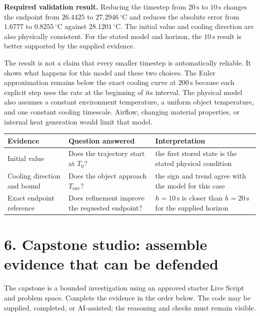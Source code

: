 \documentclass[11pt,a4paper]{article}
\newcommand{\units}[1]{\,\mathrm{#1}}
\begin{document}
\begin{checkbox}\textbf{Required validation result.} Reducing the timestep from $20\units{s}$ to $10\units{s}$ changes the endpoint from $26.4425$ to $27.2946\units{^\circ C}$ and reduces the absolute error from $1.6777$ to $0.8255\units{^\circ C}$ against $28.1201\units{^\circ C}$. The initial value and cooling direction are also physically consistent. For the stated model and horizon, the $10\units{s}$ result is better supported by the supplied evidence.\end{checkbox}

The result is not a claim that every smaller timestep is automatically reliable. It shows what happens for this model and these two choices. The Euler approximation remains below the exact cooling curve at $200\units{s}$ because each explicit step uses the rate at the beginning of its interval. The physical model also assumes a constant environment temperature, a uniform object temperature, and one constant cooling timescale. Airflow, changing material properties, or internal heat generation would limit that model.

\begin{center}\small
\begin{tabular}{>{\raggedright\arraybackslash}p{.23\linewidth}>{\raggedright\arraybackslash}p{.29\linewidth}>{\raggedright\arraybackslash}p{.37\linewidth}}
\toprule
\textbf{Evidence} & \textbf{Question answered} & \textbf{Interpretation} \\
\midrule
Initial value & Does the trajectory start at $T_0$? & the first stored state is the stated physical condition \\
Cooling direction and bound & Does the object approach $T_{\mathrm{env}}$? & the sign and trend agree with the model for this case \\
Exact endpoint reference & Does refinement improve the requested endpoint? & $h=10\units{s}$ is closer than $h=20\units{s}$ for the supplied horizon \\
\bottomrule
\end{tabular}
\end{center}

\section*{6. Capstone studio: assemble evidence that can be defended}
The capstone is a bounded investigation using an approved starter Live Script and problem space. Complete the evidence in the order below. The code may be supplied, completed, or AI-assisted; the reasoning and checks must remain visible.
\end{document}
